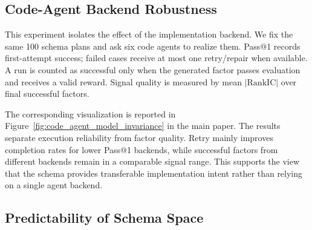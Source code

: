 \subsection{Code-Agent Backend Robustness}
\label{sec:appendix_code_agent_robustness}

This experiment isolates the effect of the implementation backend. We fix the same 100 schema plans and ask six code agents to realize them. Pass@1 records first-attempt success; failed cases receive at most one retry/repair when available. A run is counted as successful only when the generated factor passes evaluation and receives a valid reward. Signal quality is measured by mean \(|\mathrm{RankIC}|\) over final successful factors.

\begin{table}[t]
\centering
\caption{Repair-aware code-agent backend robustness on the same 100 schema plans. Kimi is reported under pass@1 only because retry was not available in this export.}
\label{tab:appendix_code_agent_robustness}
\setlength\tabcolsep{3.4pt}
\small
{}
\end{table}

The corresponding visualization is reported in Figure~\ref{fig:code_agent_model_invariance} in the main paper. The results separate execution reliability from factor quality. Retry mainly improves completion rates for lower Pass@1 backends, while successful factors from different backends remain in a comparable signal range. This supports the view that the schema provides transferable implementation intent rather than relying on a single agent backend.

\subsection{Predictability of Schema Space}
\label{sec:appendix_schema_predictability}

